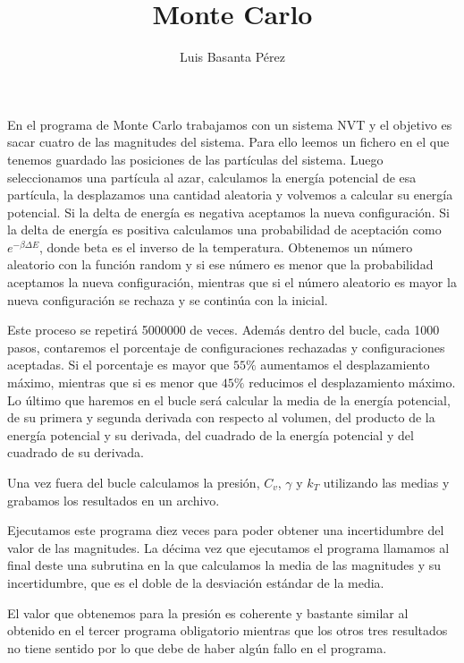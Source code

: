 \documentclass[a4paper, 12pt] {article}
\title{Monte Carlo}
\author{Luis Basanta Pérez}
\date{}
\begin{document}
\maketitle

En el programa de Monte Carlo trabajamos con un sistema NVT y el objetivo es sacar cuatro de las magnitudes del sistema. Para ello leemos un fichero en el que tenemos guardado las posiciones de las partículas del sistema. Luego seleccionamos una partícula al azar, calculamos la energía potencial de esa partícula, la desplazamos una cantidad aleatoria y volvemos a calcular su energía potencial. Si la delta de energía es negativa aceptamos la nueva configuración. Si la delta de energía es positiva calculamos una probabilidad de aceptación como $e^{-\beta \Delta E}$, donde beta es el inverso de la temperatura. Obtenemos un número aleatorio con la función random y si ese número es menor que la probabilidad aceptamos la nueva configuración, mientras que si el número aleatorio es mayor la nueva configuración se rechaza y se continúa con la inicial.

Este proceso se repetirá 5000000 de veces. Además dentro del bucle, cada 1000 pasos, contaremos el porcentaje de configuraciones rechazadas y configuraciones aceptadas. Si el porcentaje es mayor que $55\%$ aumentamos el desplazamiento máximo, mientras que si es menor que $45\%$ reducimos el desplazamiento máximo. Lo último que haremos en el bucle será calcular la media de la energía potencial, de su primera y segunda derivada con respecto al volumen, del producto de la energía potencial y su derivada, del cuadrado de la energía potencial y del cuadrado de su derivada.

Una vez fuera del bucle calculamos la presión, $C_v$, $\gamma$ y $k_T$ utilizando las medias y grabamos los resultados en un archivo.

Ejecutamos este programa diez veces para poder obtener una incertidumbre del valor de las magnitudes. La décima vez que ejecutamos el programa llamamos al final deste una subrutina en la que calculamos la media de las magnitudes y su incertidumbre, que es el doble de la desviación estándar de la media. 

El valor que obtenemos para la presión es coherente y bastante similar al obtenido en el tercer programa obligatorio mientras que los otros tres resultados no tiene sentido por lo que debe de haber algún fallo en el programa.
\end{document}

